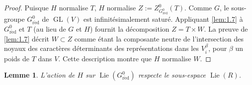 \documentclass[11pt,a4paper]{article}
\theoremstyle{plain}
\newtheorem{lemma}[theorem]{Lemme}
\theoremstyle{definition}
\DeclareMathOperator{\Lie}{Lie}
\DeclareMathOperator{\GL}{GL}
\newcommand{\red}{\mathrm{r\acute{e}d}}
\begin{document}
\begin{proof}
Puisque $H$ normalise $T$, $H$ normalise $Z := Z^0_{G^0_\red}(T)$. Comme $G$, le sous-groupe $G^0_\red$ de $\GL(V)$ est infinit\'esimalement satur\'e. Appliquant \ref{lem:1.7} \`a $G^0_\red$ et $T$ (au lieu de $G$ et $H$) fournit la d\'ecomposition $Z = T \times W$. La preuve de \ref{lem:1.7} d\'ecrit $W \subset Z$ comme \'etant la composante neutre de l'intersection des noyaux des caract\`eres d\'eterminants des repr\'esentations dans les $V_i^\beta$, pour $\beta$ un poids de $T$ dans $V$. Cette description montre que $H$ normalise $W$.
\end{proof}

\begin{lemma}\label{lem:1.22}
L'action de $H$ sur $\Lie(G^0_\red)$ respecte le sous-espace $\Lie(R)$.
\end{lemma}
\end{document}
